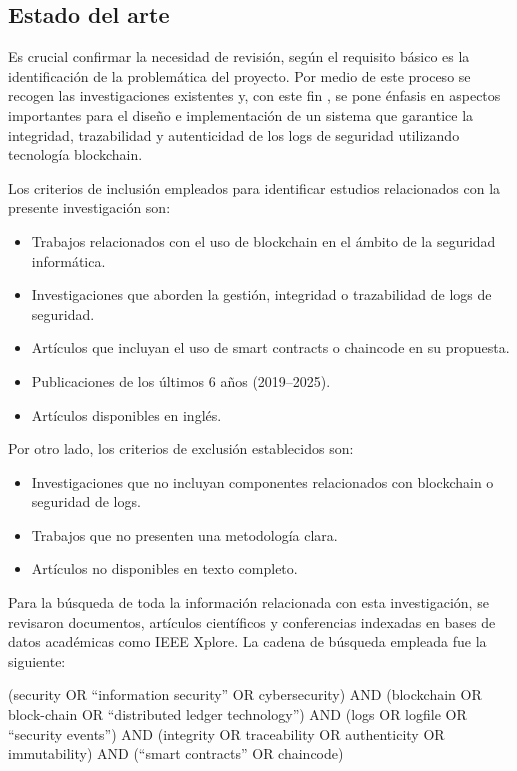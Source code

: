 \subsection{Estado del arte}
Es crucial confirmar la necesidad de revisión, según el requisito básico es la identificación de la problemática del proyecto. Por medio de este proceso se recogen las investigaciones existentes y, con este fin , se pone énfasis en aspectos importantes para el diseño e implementación de un sistema que garantice la integridad, trazabilidad y autenticidad de los logs de seguridad utilizando tecnología blockchain.

Los criterios de inclusión empleados para identificar estudios relacionados con la presente investigación son:
\begin{itemize}
    \item Trabajos relacionados con el uso de blockchain en el ámbito de la seguridad informática.
    \item Investigaciones que aborden la gestión, integridad o trazabilidad de logs de seguridad.
    \item Artículos que incluyan el uso de smart contracts o chaincode en su propuesta.
    \item Publicaciones de los últimos 6 años (2019–2025).
    \item Artículos disponibles en inglés.
\end{itemize}

Por otro lado, los criterios de exclusión establecidos son:
\begin{itemize}
    \item Investigaciones que no incluyan componentes relacionados con blockchain o seguridad de logs.
    \item Trabajos que no presenten una metodología clara.
    \item Artículos no disponibles en texto completo.
\end{itemize}

Para la búsqueda de toda la información relacionada con esta investigación, se revisaron documentos, artículos científicos y conferencias indexadas en bases de datos académicas como IEEE Xplore. La cadena de búsqueda empleada fue la siguiente:

(security OR “information security” OR cybersecurity) AND (blockchain OR block-chain OR “distributed ledger technology”) AND (logs OR logfile OR “security events”) AND (integrity OR traceability OR authenticity OR immutability) AND (“smart contracts” OR chaincode)


